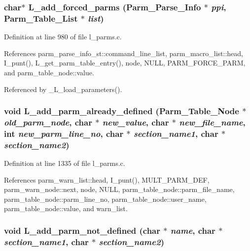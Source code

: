\subsubsection{\setlength{\rightskip}{0pt plus 5cm}char$\ast$ L\_\-add\_\-forced\_\-parms (\bf{Parm\_\-Parse\_\-Info} $\ast$ {\em ppi}, \bf{Parm\_\-Table\_\-List} $\ast$ {\em list})}\label{l__parms_8c_0cff626f34e757eb416f847b3dff5c9f}




Definition at line 980 of file l\_\-parms.c.

References parm\_\-parse\_\-info\_\-st::command\_\-line\_\-list, parm\_\-macro\_\-list::head, I\_\-punt(), L\_\-get\_\-parm\_\-table\_\-entry(), node, NULL, PARM\_\-FORCE\_\-PARM, and parm\_\-table\_\-node::value.

Referenced by \_\-L\_\-load\_\-parameters().
\subsubsection{\setlength{\rightskip}{0pt plus 5cm}void L\_\-add\_\-parm\_\-already\_\-defined (\bf{Parm\_\-Table\_\-Node} $\ast$ {\em old\_\-parm\_\-node}, char $\ast$ {\em new\_\-value}, char $\ast$ {\em new\_\-file\_\-name}, int {\em new\_\-parm\_\-line\_\-no}, char $\ast$ {\em section\_\-name1}, char $\ast$ {\em section\_\-name2})}\label{l__parms_8c_4b6a82da614d3b3ea4e54dfd0d19a542}




Definition at line 1335 of file l\_\-parms.c.

References parm\_\-warn\_\-list::head, I\_\-punt(), MULT\_\-PARM\_\-DEF, parm\_\-warn\_\-node::next, node, NULL, parm\_\-table\_\-node::parm\_\-file\_\-name, parm\_\-table\_\-node::parm\_\-line\_\-no, parm\_\-table\_\-node::user\_\-name, parm\_\-table\_\-node::value, and warn\_\-list.
\subsubsection{\setlength{\rightskip}{0pt plus 5cm}void L\_\-add\_\-parm\_\-not\_\-defined (char $\ast$ {\em name}, char $\ast$ {\em section\_\-name1}, char $\ast$ {\em section\_\-name2})}\label{l__parms_8c_85b066cb30b7b9673e83af5767eb0acd}




